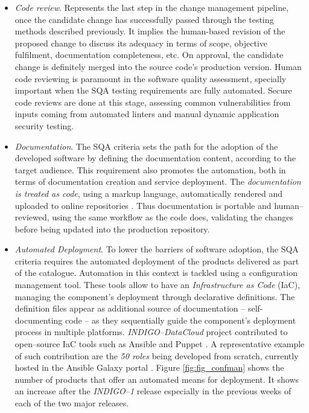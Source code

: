 \documentclass[journal]{IEEEtran}
\begin{document}
\begin{itemize}
\item \textit{Code review}.
Represents the last step in the change management pipeline, once the candidate change has
successfully passed through the testing methods described previously. It implies the human-based
revision of the proposed change to discuss its adequacy in terms of scope, objective fulfilment,
documentation completeness, etc. On approval, the candidate change is definitely merged into
the source code's production version. Human code reviewing is paramount in the software quality assessment, specially
important when the SQA testing requirements are fully automated. Secure code reviews are
done at this stage, assessing common vulnerabilities from inputs coming from automated linters
and manual dynamic application security testing.

\item \textit{Documentation}.
The SQA criteria sets the path for the adoption of the developed software by
defining the documentation content, according to the target audience. This requirement also
promotes the automation, both in terms of documentation creation and service deployment. The
\textit{documentation is treated as code}, using a markup language, automatically rendered and
uploaded to online repositories \cite{indigo-gitbook}. Thus documentation is portable and
human--reviewed, using the same workflow as the code does, validating the changes before being
updated into the production repository.

\item \textit{Automated Deployment}.
To lower the barriers of software adoption, the SQA criteria requires the automated
deployment of the products delivered as part of the catalogue. Automation in this context is
tackled using a configuration management tool. These tools allow to have an
\textit{Infrastructure as Code} (IaC), managing the component's deployment through declarative
definitions. The definition files appear as additional source of documentation
-- self-documenting code -- as they sequentially guide the component's deployment process in multiple
platforms. {\sl INDIGO--DataCloud} project contributed to open--source IaC tools such
as Ansible \cite{indigo-ansible} and Puppet \cite{indigo-puppet}. A representative example of
such contribution are the \textit{50 roles} being developed from scratch, currently hosted in
the Ansible Galaxy portal \cite{indigo-galaxy}. Figure
\ref{fig:fig_confman} shows the number of products that offer an automated means for deployment.
It shows an increase after the {\sl INDIGO--1} release especially in the previous weeks of each
of the two major releases.
\end{itemize}
\end{document}
